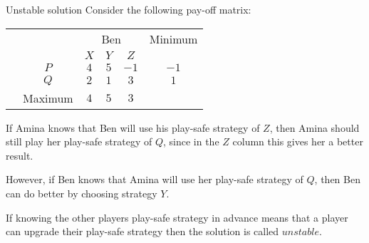 \documentclass[8pt]{beamer}
\begin{document}
\begin{frame}[shrink=2]{Unstable solution}
	Consider the following pay-off matrix:

		\begin{center}
\colorbox{cc}{
	\setlength\arrayrulewidth{0.5mm}
\begin{tabular}{cc|cccc}
	\multicolumn{2}{c}{} & \multicolumn{3}{c}{Ben} & Minimum \\
	\multicolumn{1}{c}{} &  & $X$  & $Y$ & $Z$ & \\ \hline
	\raisebox{0.0cm}{\multirow{2}*{\rotatebox{90}{Amina}}}  & $P$ & $4$ & $5$ & $-1$ & $-1$ \\
							       & $Q$ & $2$ & $1$ & $3$ & $1$\\
							       & Maximum & $4$ &  $5$ &  $3$ & \\
\end{tabular}}
\end{center}

If Amina knows that Ben will use his play-safe strategy of $Z$, then Amina should still play her play-safe strategy of $Q$, since in the $Z$ column this gives her a better result.

However, if Ben knows that Amina will use her play-safe strategy of $Q$, then Ben can do better by choosing strategy $Y$.

\begin{definition}
	If knowing the other players play-safe strategy in advance means that a player can upgrade their play-safe strategy then the solution is called $unstable$.
\end{definition}

\end{frame}
\end{document}
